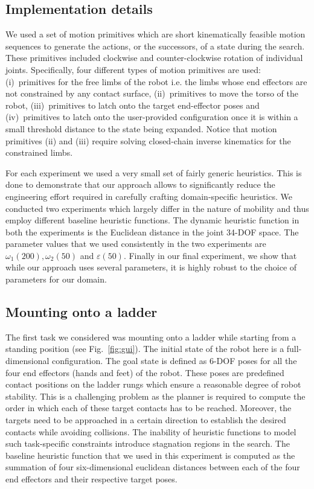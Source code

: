 \documentclass{article}
\begin{document}
\subsection{Implementation details}
We used a set of motion primitives which are short kinematically feasible motion sequences to generate the actions, or the successors, of a state during the search. These primitives included clockwise and counter-clockwise rotation of individual joints. 
Specifically, four different types of motion primitives are used:
(i)~primitives for the free limbs of the robot i.e. the limbs whose end effectors are not constrained by any contact surface,  
(ii)~primitives to move the torso of the robot,
(iii)~primitives to latch onto the target end-effector poses
and
(iv)~primitives to latch onto the user-provided configuration once it is within a small threshold distance to the state being expanded.
Notice that motion primitives (ii) and (iii) require solving closed-chain inverse kinematics for the constrained limbs.

For each experiment we used a very small set of fairly generic heuristics. 
This is done to demonstrate that our approach allows to significantly reduce the engineering effort required in carefully crafting domain-specific heuristics. 
We conducted two experiments which largely differ in the nature of mobility and thus employ different baseline heuristic functions. 
The dynamic heuristic function in both the experiments is the Euclidean distance in the joint 34-DOF space.
The parameter values that we used consistently in the two experiments are $\omega_1 (200), \omega_2 (50)$ and $\varepsilon (50)$.
Finally in our final experiment, we show that while our approach uses several parameters, it is highly robust to the choice of parameters for our domain.

\subsection{Mounting onto a ladder}
The first task we considered was  mounting onto a ladder while starting from a standing position  (see Fig.~\ref{fig:gui}). 
The initial state of the robot here is a full-dimensional configuration. The goal state is defined as 6-DOF poses for all the four end effectors (hands and feet) of the robot. These poses are predefined contact positions on the ladder rungs which ensure a reasonable degree of robot stability. 
This is a challenging problem as the planner is required to compute the order in which each of these target contacts has to be reached. Moreover, the targets need to be approached in a certain direction to establish the desired contacts while avoiding collisions. 
The inability of heuristic functions to model such task-specific constraints introduce stagnation regions in the search. 
The baseline heuristic function that we used in this experiment is computed as the summation of four six-dimensional euclidean distances between each of the four end effectors and their respective target poses.
\end{document}
